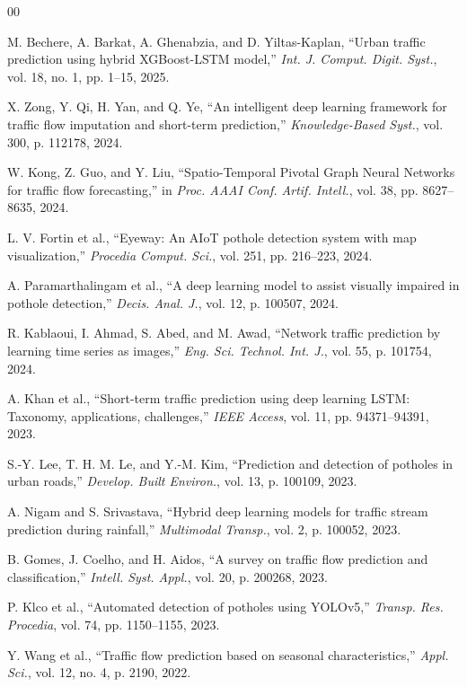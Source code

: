 \documentclass[conference]{IEEEtran}
\begin{document}
\begin{thebibliography}{00}

M. Bechere, A. Barkat, A. Ghenabzia, and D. Yiltas-Kaplan, ``Urban traffic prediction using hybrid XGBoost-LSTM model,'' \textit{Int. J. Comput. Digit. Syst.}, vol. 18, no. 1, pp. 1--15, 2025.

X. Zong, Y. Qi, H. Yan, and Q. Ye, ``An intelligent deep learning framework for traffic flow imputation and short-term prediction,'' \textit{Knowledge-Based Syst.}, vol. 300, p. 112178, 2024.

W. Kong, Z. Guo, and Y. Liu, ``Spatio-Temporal Pivotal Graph Neural Networks for traffic flow forecasting,'' in \textit{Proc. AAAI Conf. Artif. Intell.}, vol. 38, pp. 8627--8635, 2024.

L. V. Fortin et al., ``Eyeway: An AIoT pothole detection system with map visualization,'' \textit{Procedia Comput. Sci.}, vol. 251, pp. 216--223, 2024.

A. Paramarthalingam et al., ``A deep learning model to assist visually impaired in pothole detection,'' \textit{Decis. Anal. J.}, vol. 12, p. 100507, 2024.

R. Kablaoui, I. Ahmad, S. Abed, and M. Awad, ``Network traffic prediction by learning time series as images,'' \textit{Eng. Sci. Technol. Int. J.}, vol. 55, p. 101754, 2024.

A. Khan et al., ``Short-term traffic prediction using deep learning LSTM: Taxonomy, applications, challenges,'' \textit{IEEE Access}, vol. 11, pp. 94371--94391, 2023.

S.-Y. Lee, T. H. M. Le, and Y.-M. Kim, ``Prediction and detection of potholes in urban roads,'' \textit{Develop. Built Environ.}, vol. 13, p. 100109, 2023.

A. Nigam and S. Srivastava, ``Hybrid deep learning models for traffic stream prediction during rainfall,'' \textit{Multimodal Transp.}, vol. 2, p. 100052, 2023.

B. Gomes, J. Coelho, and H. Aidos, ``A survey on traffic flow prediction and classification,'' \textit{Intell. Syst. Appl.}, vol. 20, p. 200268, 2023.

P. Klco et al., ``Automated detection of potholes using YOLOv5,'' \textit{Transp. Res. Procedia}, vol. 74, pp. 1150--1155, 2023.

Y. Wang et al., ``Traffic flow prediction based on seasonal characteristics,'' \textit{Appl. Sci.}, vol. 12, no. 4, p. 2190, 2022.


\end{thebibliography}
\end{document}
